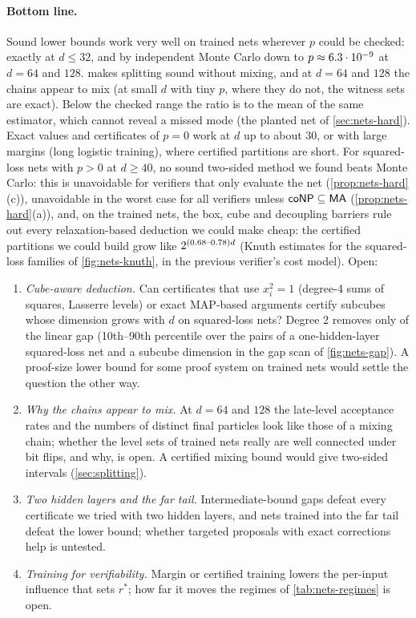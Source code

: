 \paragraph{Bottom line.}\label{sec:nets-open} Sound lower bounds work very well on
trained nets wherever $p$ could be checked: exactly at $d\le32$, and by independent
Monte Carlo down to $p\approx6.3\cdot10^{-9}$ at $d=64$ and $128$. 
makes splitting sound without mixing, and at $d=64$ and $128$ the chains appear to mix
(at small $d$ with tiny $p$, where they do not, the witness sets are exact). Below the
checked range the ratio is to the mean of the same estimator, which cannot reveal a
missed mode (the planted net of \cref{sec:nets-hard}). Exact values and
certificates of $p=0$ work at $d$ up to about $30$, or with large margins (long
logistic training), where certified partitions are short. For squared-loss nets with
$p>0$ at $d\ge40$, no sound two-sided method we found beats Monte Carlo: this is
unavoidable for verifiers that only evaluate the net (\cref{prop:nets-hard}(c)),
unavoidable in the worst case for all verifiers unless $\mathsf{coNP}\subseteq\mathsf{MA}$
(\cref{prop:nets-hard}(a)), and, on the trained nets, the box, cube and decoupling
barriers rule out every relaxation-based deduction we could make cheap: the certified
partitions we could build grow like $2^{(0.68\text{--}0.78)d}$ (Knuth estimates for the
squared-loss families of \cref{fig:nets-knuth}, in the previous verifier's cost model). Open:
\begin{enumerate}
\item \emph{Cube-aware deduction.} Can certificates that use $x_i^2=1$ (degree-4 sums
of squares, Lasserre levels) or exact MAP-based arguments certify subcubes whose
dimension grows with $d$ on squared-loss nets? Degree 2 removes only \nnQuadGapCutMse{}
of the linear gap (10th--90th percentile over the \nnQuadGapPairs{} pairs of a
one-hidden-layer squared-loss net and a subcube dimension in the gap scan of
\cref{fig:nets-gap}). A
proof-size lower bound for some proof system on trained nets would settle the question
the other way.
\item \emph{Why the chains appear to mix.} At $d=64$ and $128$ the late-level
acceptance rates and the numbers of distinct final particles look like those of a
mixing chain; whether the level sets of trained nets really are well connected under
bit flips, and why, is open. A certified mixing bound would give two-sided intervals
(\cref{sec:splitting}).
\item \emph{Two hidden layers and the far tail.} Intermediate-bound gaps defeat every
certificate we tried with two hidden layers, and nets trained into the far tail defeat
the lower bound; whether targeted proposals with exact corrections help is untested.
\item \emph{Training for verifiability.} Margin or certified training lowers the
per-input influence that sets $r^*$; how far it moves the regimes of
\cref{tab:nets-regimes} is open.
\end{enumerate}

\clearpage
